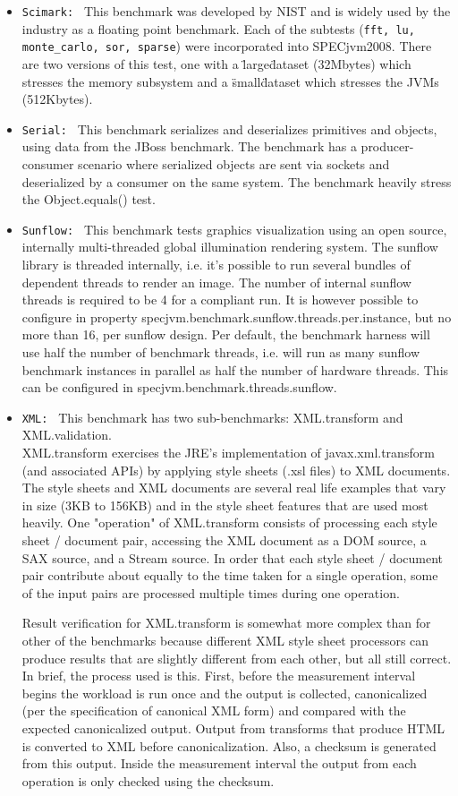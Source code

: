 \begin{itemize}
\item \texttt{Scimark: } This benchmark was developed by NIST and is widely used by the industry as a floating point benchmark. Each of the subtests (\texttt{fft, lu, monte\_carlo, sor, sparse}) were incorporated into SPECjvm2008. There are two versions of this test, one with a \"large\" dataset (32Mbytes) which stresses the memory subsystem and a \"small\" dataset which stresses the JVMs (512Kbytes).
\item \texttt{Serial: } This benchmark serializes and deserializes primitives and objects, using data from the JBoss benchmark. The benchmark has a producer-consumer scenario where serialized objects are sent via sockets and deserialized by a consumer on the same system. The benchmark heavily stress the Object.equals() test.
\item \texttt{Sunflow: } This benchmark tests graphics visualization using an open source, internally multi-threaded global illumination rendering system. The sunflow library is threaded internally, i.e. it's possible to run several bundles of dependent threads to render an image. The number of internal sunflow threads is required to be 4 for a compliant run. It is however possible to configure in property specjvm.benchmark.sunflow.threads.per.instance, but no more than 16, per sunflow design. Per default, the benchmark harness will use half the number of benchmark threads, i.e. will run as many sunflow benchmark instances in parallel as half the number of hardware threads. This can be configured in specjvm.benchmark.threads.sunflow.
\item \texttt{XML: } This benchmark has two sub-benchmarks: XML.transform and XML.validation.
\\XML.transform exercises the JRE's implementation of javax.xml.transform (and associated APIs) by applying style sheets (.xsl files) to XML documents. The style sheets and XML documents are several real life examples that vary in size (3KB to 156KB) and in the style sheet features that are used most heavily. One "operation" of XML.transform consists of processing each style sheet / document pair, accessing the XML document as a DOM source, a SAX source, and a Stream source. In order that each style sheet / document pair contribute about equally to the time taken for a single operation, some of the input pairs are processed multiple times during one operation.

Result verification for XML.transform is somewhat more complex than for other of the benchmarks because different XML style sheet processors can produce results that are slightly different from each other, but all still correct. In brief, the process used is this. First, before the measurement interval begins the workload is run once and the output is collected, canonicalized (per the specification of canonical XML form) and compared with the expected canonicalized output. Output from transforms that produce HTML is converted to XML before canonicalization. Also, a checksum is generated from this output. Inside the measurement interval the output from each operation is only checked using the checksum.


\end{itemize}
